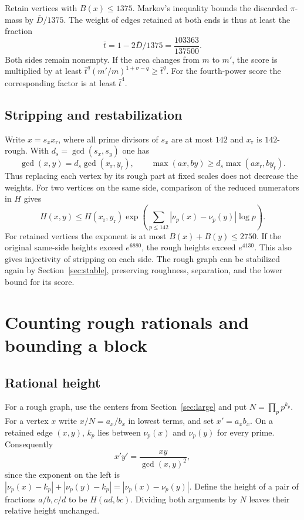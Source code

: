 \documentclass[11pt,a4paper]{article}
\begin{document}
Retain vertices with \(B(x)\le1375\). Markov's inequality bounds
the discarded \(\pi\)-mass by \(\overline D/1375\). The weight of
edges retained at both ends is thus at least the fraction
\[
 \bar t=1-2\overline D/1375=\frac{103363}{137500}.
\]
Both sides remain nonempty. If the area changes from \(m\) to \(m'\),
the score is multiplied by at least
\(\bar t^q(m'/m)^{1+\sigma-q}\ge\bar t^q\).
For the fourth-power score the corresponding factor is at least
\(\bar t^4\).

\subsection{Stripping and restabilization}

Write \(x=s_xx_{\mathrm r}\), where all prime divisors of \(s_x\)
are at most \(142\) and \(x_{\mathrm r}\) is \(142\)-rough.
With \(d_s=\gcd(s_x,s_y)\) one has
\[
 \gcd(x,y)=d_s\gcd(x_{\mathrm r},y_{\mathrm r}),\qquad
 \max(ax,by)\ge d_s\max(ax_{\mathrm r},by_{\mathrm r}).
\]
Thus replacing each vertex by its rough part at fixed scales does
not decrease the weights. For two vertices on the same side,
comparison of the reduced numerators in \(H\) gives
\[
 H(x,y)\le H(x_{\mathrm r},y_{\mathrm r})
   \exp\left(\sum_{p\le142}|\nu_p(x)-\nu_p(y)|\log p\right).
\]
For retained vertices the exponent is at most
\(B(x)+B(y)\le2750\). If the original same-side heights exceed
\(e^{6880}\), the rough heights exceed \(e^{4130}\). This also gives
injectivity of stripping on each side. The rough graph can be
stabilized again by Section~\ref{sec:stable}, preserving roughness,
separation, and the lower bound for its score.

\section{Counting rough rationals and bounding a block}

\subsection{Rational height}\label{sec:rational}

For a rough graph, use the centers from Section~\ref{sec:large} and
put \(N=\prod_p p^{k_p}\). For a vertex \(x\) write \(x/N=a_x/b_x\)
in lowest terms, and set \(x'=a_xb_x\). On a retained edge \((x,y)\),
\(k_p\) lies between \(\nu_p(x)\) and \(\nu_p(y)\) for every prime.
Consequently
\[
 x'y'=\frac{xy}{\gcd(x,y)^2},
\]
since the exponent on the left is
\(|\nu_p(x)-k_p|+|\nu_p(y)-k_p|=|\nu_p(x)-\nu_p(y)|\).
Define the height of a pair of fractions \(a/b,c/d\) to be \(H(ad,bc)\).
Dividing both arguments by \(N\) leaves their relative height unchanged.
\end{document}
